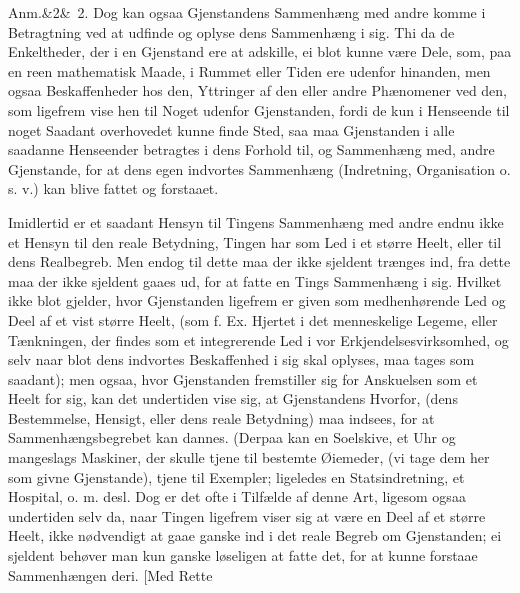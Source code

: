 \documentclass[12pt]{book}
\def\sperr#1{#1}%
\def\textit#1{#1}%
\newcommand{\sperr}[1]{\textls[180]{#1}}
\newcommand{\anm}[1]{%
  \par\vspace{0.5\baselineskip}%
  \noindent\hspace{\parindent}\sperr{Anm.}\ifx&#1&\else~\textit{#1}.\fi
  \enspace\ignorespaces
}
\newcommand{\opage}[1]{\marginnote{\footnotesize\textit{[#1]}}}
\begin{document}
\anm{2} Dog kan ogsaa Gjenstandens Sammenhæng med andre komme i Betragtning ved
at udfinde og oplyse dens Sammenhæng i sig. Thi da de Enkeltheder, der i en
Gjenstand ere at adskille, ei blot kunne være Dele, som, paa en reen
mathematisk Maade, i Rummet eller Tiden ere udenfor hinanden, men ogsaa
\opage{48} Beskaffenheder hos den, Yttringer af den eller andre Phænomener ved den, som
ligefrem vise hen til Noget udenfor Gjenstanden, fordi de kun i Henseende til
noget Saadant overhovedet kunne finde Sted, saa maa Gjenstanden i alle saadanne
Henseender betragtes i dens Forhold til, og Sammenhæng med, andre Gjenstande,
for at dens egen indvortes Sammenhæng (Indretning, Organisation o. s. v.) kan
blive fattet og forstaaet.

Imidlertid er et saadant Hensyn til Tingens Sammenhæng med andre endnu ikke et
Hensyn til den reale Betydning, Tingen har som Led i et større Heelt, eller til
dens Realbegreb. Men endog til dette maa der ikke sjeldent trænges ind, fra
dette maa der ikke sjeldent gaaes ud, for at fatte en Tings Sammenhæng i sig.
Hvilket ikke blot gjelder, hvor Gjenstanden ligefrem er given som
medhenhørende Led og Deel af et vist større Heelt, (som f. Ex. Hjertet i det
menneskelige Legeme, eller Tænkningen, der findes som et integrerende Led i vor
Erkjendelsesvirksomhed, og selv naar blot dens indvortes Beskaffenhed i sig
skal oplyses, maa tages som saadant); men ogsaa, hvor Gjenstanden fremstiller
sig for Anskuelsen som et Heelt for sig, kan det undertiden vise sig, at
Gjenstandens Hvorfor, (dens Bestemmelse, Hensigt, eller dens reale Betydning)
maa indsees, for at Sammenhængsbegrebet kan dannes. (Derpaa kan en Soelskive,
et Uhr og mangeslags Maskiner, der skulle tjene
\opage{49} til bestemte Øiemeder, (vi tage dem her som givne Gjenstande), tjene til
Exempler; ligeledes en Statsindretning, et Hospital, o. m. desl.
Dog er det ofte i
Tilfælde af denne Art, ligesom ogsaa undertiden selv da, naar Tingen ligefrem
viser sig at være en Deel af et større Heelt, ikke nødvendigt at gaae ganske
ind i det reale Begreb om Gjenstanden; ei sjeldent behøver man kun ganske
løseligen at fatte det, for at kunne forstaae Sammenhængen deri. [Med Rette
\end{document}
